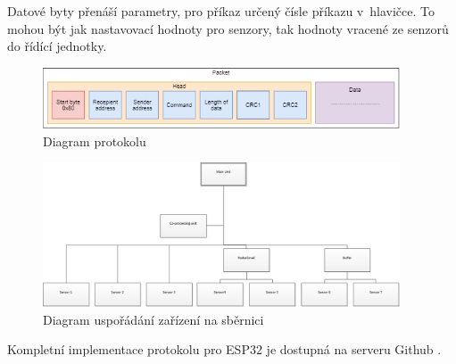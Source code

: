 Datové byty přenáší parametry, pro příkaz určený čísle příkazu v~hlavičce.
To mohou být jak nastavovací hodnoty pro senzory, tak hodnoty vracené ze senzorů do řídící jednotky.

\begin{figure}[h]
    \begin{small}
        \begin{center}
            \includegraphics[width=400px]{img/Protocol_diagram.png}
        \end{center}
        \caption{Diagram protokolu}
        \label{fig: Diagram protokolu}
    \end{small}
\end{figure}

\begin{figure}[h]
    \begin{small}
        \begin{center}
            \includegraphics[width=400px]{img/Protocol_connection_diagram.png}
        \end{center}
        \caption{Diagram uspořádání zařízení na sběrnici}
        \label{fig: Diagram sběrnice}
    \end{small}
\end{figure}


Kompletní implementace protokolu pro ESP32 je dostupná na serveru Github \cite{protocol}. 


